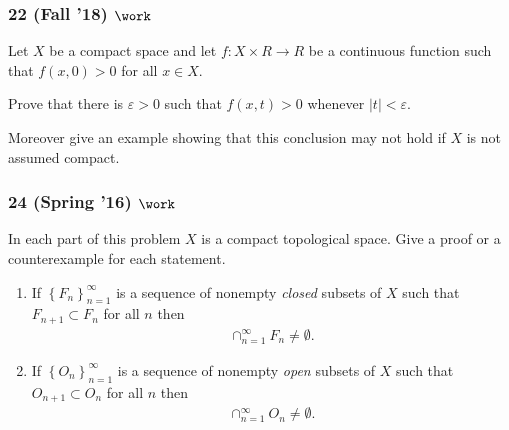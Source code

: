 \hypertarget{fall-18-work}{%
\subsubsection{\texorpdfstring{22 (Fall '18)
\(\work\)}{22 (Fall '18) \textbackslash work}}\label{fall-18-work}}

\begin{problem}[?]

Let \(X\) be a compact space and let \(f : X \times R \to R\) be a
continuous function such that \(f (x, 0) > 0\) for all \(x \in X\).

Prove that there is \(\varepsilon> 0\) such that \(f (x, t) > 0\)
whenever \({\left\lvert {t} \right\rvert} < \varepsilon\).

Moreover give an example showing that this conclusion may not hold if
\(X\) is not assumed compact.

\end{problem}

\hypertarget{spring-16-work}{%
\subsubsection{\texorpdfstring{24 (Spring '16)
\(\work\)}{24 (Spring '16) \textbackslash work}}\label{spring-16-work}}

\begin{problem}[?]

In each part of this problem \(X\) is a compact topological space. Give
a proof or a counterexample for each statement.

\begin{enumerate}
\def\labelenumi{\alph{enumi}.}
\item
  If \(\left\{{F_n }\right\}_{n=1}^\infty\) is a sequence of nonempty
  \emph{closed} subsets of \(X\) such that \(F_{n+1} \subset F_{n}\) for
  all \(n\) then
  \begin{align*}\cap^\infty_{n=1} F_n\neq \emptyset.\end{align*}
\item
  If \(\left\{{O_n}\right\}_{n=1}^\infty\) is a sequence of nonempty
  \emph{open} subsets of \(X\) such that \(O_{n+1} \subset O_n\) for all
  \(n\) then
  \begin{align*}\cap_{n=1}^\infty O_{n}\neq \emptyset.\end{align*}
\end{enumerate}

\end{problem}

